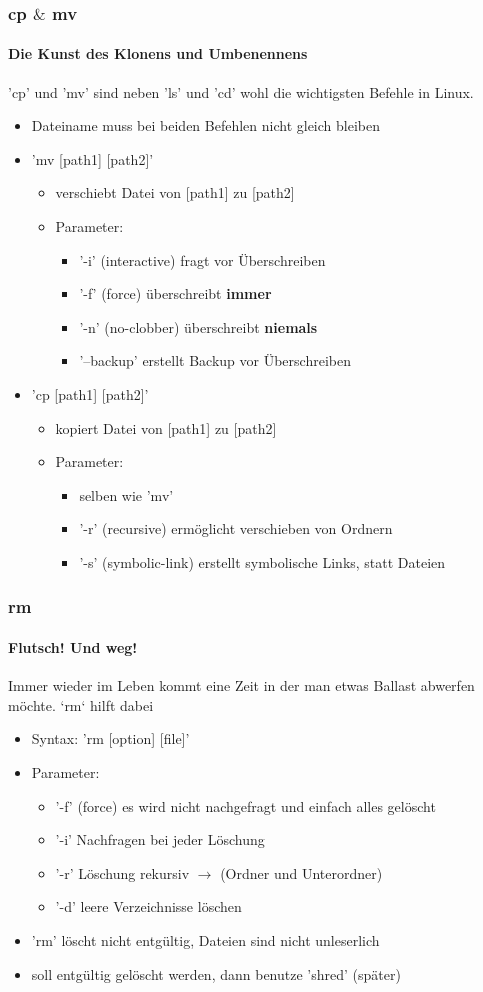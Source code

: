 \documentclass[12pt,utf8]{beamer}
\begin{document}
\begin{frame}
\frametitle{cp $\&$ mv}
\framesubtitle{Die Kunst des Klonens und Umbenennens}
'cp' und 'mv' sind neben 'ls' und 'cd' wohl die wichtigsten Befehle in Linux.
\begin{itemize}
	\item Dateiname muss bei beiden Befehlen nicht gleich bleiben
	\item 'mv [path1] [path2]'
	\begin{itemize}
		\item verschiebt Datei von [path1] zu [path2]
		\item Parameter:
		\begin{itemize}[<+->]
			\item '-i' (interactive) fragt vor Überschreiben
			\item '-f' (force) überschreibt \textbf{immer}
			\item '-n' (no-clobber) überschreibt \textbf{niemals}
			\item '--backup' erstellt Backup vor Überschreiben
		\end{itemize}
	\end{itemize}
	\item 'cp [path1] [path2]'
	\begin{itemize}
		\item kopiert Datei von [path1] zu [path2]
		\item Parameter:
		\begin{itemize}[<+->]
			\item selben wie 'mv'
			\item '-r' (recursive) ermöglicht verschieben von Ordnern
			\item '-s' (symbolic-link) erstellt symbolische Links, statt Dateien
		\end{itemize}
	\end{itemize}
\end{itemize}
\end{frame}

\begin{frame}
\frametitle{rm}
\framesubtitle{Flutsch! Und weg!}
Immer wieder im Leben kommt eine Zeit in der man etwas Ballast abwerfen möchte.  
`rm` hilft dabei
\begin{itemize}[<+->]
	\item Syntax: 'rm [option] [file]'
	\item Parameter:
	\begin{itemize}[<+->]
		\item '-f' (force) es wird nicht nachgefragt und einfach alles gelöscht
		\item '-i' Nachfragen bei jeder Löschung
		\item '-r' Löschung rekursiv $\to$ (Ordner und Unterordner)
		\item '-d' leere Verzeichnisse löschen
	\end{itemize}
	\item 'rm' löscht nicht entgültig, Dateien sind nicht unleserlich
	\item soll entgültig gelöscht werden, dann benutze 'shred' (später)
\end{itemize}
\end{frame}
\end{document}

